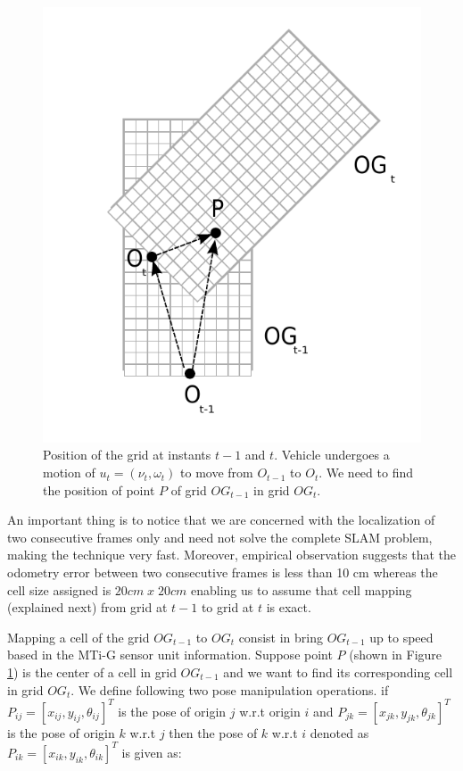 \begin{figure}[h]
\begin{center}
\includegraphics[scale=0.8]{img/fig:translation}
\caption{Position of the grid at instants $t-1$ and $t$. Vehicle undergoes a motion of $u_t=(\nu_t, \omega_t)$ to move from $O_{t-1}$ to $O_t$. We need to find the position of point $P$ of grid $OG_{t-1}$ in grid $OG_t$.}
\label{fig:gridmove}
\end{center}
\end{figure}

An important thing is to notice that we are concerned with the localization of two consecutive frames only
and need not solve the complete SLAM problem, making the technique very fast. Moreover, empirical observation suggests that the odometry error between two consecutive frames is less than 10 cm whereas the cell size assigned is $20cm \; x \; 20cm$ enabling us to assume that cell mapping (explained next) from grid at $t-1$ to grid at $t$ is exact.

Mapping a cell of the grid $OG_{t-1}$ to $OG_t$ consist in bring $OG_{t-1}$ up to speed based in the MTi-G sensor unit information. Suppose point $P$ (shown in Figure \ref{fig:gridmove}) is the center of a cell in grid $OG_{t-1}$ and we want to find its corresponding cell in grid $OG_t$. We define following two pose manipulation operations. if $P_{ij}=[x_{ij}, y_{ij}, \theta_{ij}]^T$ is the pose of origin $j$ w.r.t origin $i$ and $P_{jk}=[x_{jk}, y_{jk}, \theta_{jk}]^T$ is the pose of origin $k$ w.r.t $j$ then the pose of $k$ w.r.t $i$ denoted as $P_{ik}=[x_{ik}, y_{ik}, \theta_{ik}]^T$ is given as:

